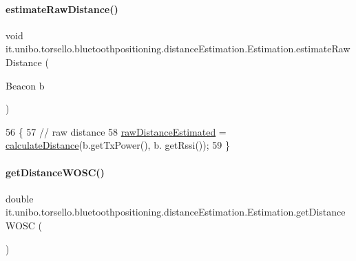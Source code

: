 \paragraph{\texorpdfstring{estimate\+Raw\+Distance()}{estimateRawDistance()}}
{\footnotesize\ttfamily void it.\+unibo.\+torsello.\+bluetoothpositioning.\+distance\+Estimation.\+Estimation.\+estimate\+Raw\+Distance (\begin{DoxyParamCaption}\item[{Beacon}]{b }\end{DoxyParamCaption})\hspace{0.3cm}{\ttfamily [private]}}


\begin{DoxyCode}
56                                               \{
57         \textcolor{comment}{// raw distance}
58         \hyperlink{classit_1_1unibo_1_1torsello_1_1bluetoothpositioning_1_1distanceEstimation_1_1Estimation_a5afcd0b9b73a92b64669f060206f35db_a5afcd0b9b73a92b64669f060206f35db}{rawDistanceEstimated} = \hyperlink{classit_1_1unibo_1_1torsello_1_1bluetoothpositioning_1_1distanceEstimation_1_1Estimation_a6e33d4e0b776517a86c6aa87cd51b66b_a6e33d4e0b776517a86c6aa87cd51b66b}{calculateDistance}(b.getTxPower(), b.
      getRssi());
59     \}
\end{DoxyCode}
\hypertarget{classit_1_1unibo_1_1torsello_1_1bluetoothpositioning_1_1distanceEstimation_1_1Estimation_a5c7bce21cd77c98a8d1e6df4c930397c_a5c7bce21cd77c98a8d1e6df4c930397c}{}\label{classit_1_1unibo_1_1torsello_1_1bluetoothpositioning_1_1distanceEstimation_1_1Estimation_a5c7bce21cd77c98a8d1e6df4c930397c_a5c7bce21cd77c98a8d1e6df4c930397c} 
\paragraph{\texorpdfstring{get\+Distance\+W\+O\+S\+C()}{getDistanceWOSC()}}
{\footnotesize\ttfamily double it.\+unibo.\+torsello.\+bluetoothpositioning.\+distance\+Estimation.\+Estimation.\+get\+Distance\+W\+O\+SC (\begin{DoxyParamCaption}{ }\end{DoxyParamCaption})}


